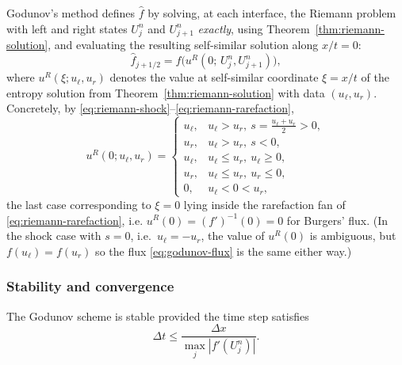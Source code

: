 Godunov's method defines $\widehat f$ by solving, at each interface, the
Riemann problem with left and right states $U_j^n$ and $U_{j+1}^n$
\emph{exactly}, using Theorem~\ref{thm:riemann-solution}, and evaluating
the resulting self-similar solution along $x/t=0$:
\begin{equation}
  \label{eq:godunov-flux}
  \widehat f_{j+1/2} = f\big(u^R(0;\, U_j^n, U_{j+1}^n)\big),
\end{equation}
where $u^R(\xi; u_\ell, u_r)$ denotes the value at self-similar
coordinate $\xi=x/t$ of the entropy solution from
Theorem~\ref{thm:riemann-solution} with data $(u_\ell,u_r)$. Concretely,
by \eqref{eq:riemann-shock}--\eqref{eq:riemann-rarefaction},
\begin{equation}
  u^R(0; u_\ell,u_r) =
  \begin{cases}
    u_\ell, & u_\ell>u_r,\ s=\tfrac{u_\ell+u_r}{2}>0, \\
    u_r, & u_\ell>u_r,\ s<0, \\
    u_\ell, & u_\ell\le u_r,\ u_\ell\ge0, \\
    u_r, & u_\ell\le u_r,\ u_r\le0, \\
    0, & u_\ell < 0 < u_r,
  \end{cases}
\end{equation}
the last case corresponding to $\xi=0$ lying inside the rarefaction fan of
\eqref{eq:riemann-rarefaction}, i.e. $u^R(0)=(f')^{-1}(0)=0$ for Burgers'
flux. (In the shock case with $s=0$, i.e.\ $u_\ell=-u_r$, the value of
$u^R(0)$ is ambiguous, but $f(u_\ell)=f(u_r)$ so the flux
\eqref{eq:godunov-flux} is the same either way.)

\subsubsection{Stability and convergence}
\label{subsubsec:godunov-convergence}

\begin{proposition}
\label{prop:cfl}
The Godunov scheme is stable provided the time step satisfies
\begin{equation}
  \label{eq:cfl}
  \Delta t \le \frac{\Delta x}{\max_j |f'(U_j^n)|}.
\end{equation}
\end{proposition}

